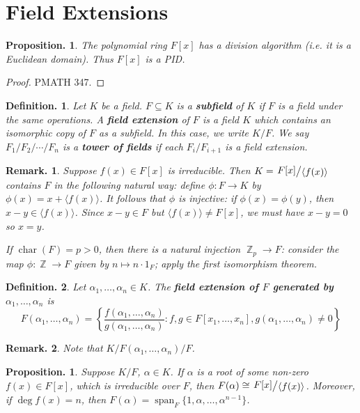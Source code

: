 \documentclass[11pt, a4paper]{memoir}
\DeclareMathOperator{\Z}{{\mathbb{Z}}}
\newcommand{\mbf}[1]{{\boldmath\bfseries #1}}
\theoremstyle{change}
\newtheorem{proposition}[theorem]{Proposition.}
\theoremstyle{plain}
\theoremstyle{nonumberplain}
\newtheorem{definition}{Definition.}
\newtheorem{remark}{Remark.}
\newtheorem{proof}{Proof}
\DeclareMathOperator{\spn}{span}
\newcommand{\quot}[2]{\mathchoice{\left.\raisebox{0.14em}{$#1$}\middle/\raisebox{-0.14em}{$#2$}\right.}
                                 {\left.\raisebox{0.08em}{$#1$}\middle/\raisebox{-0.08em}{$#2$}\right.}
                                 {\left.\raisebox{0.03em}{$#1$}\middle/\raisebox{-0.03em}{$#2$}\right.}
                                 {\left.\raisebox{0em}{$#1$}\middle/\raisebox{0em}{$#2$}\right.}}
\numberwithin{equation}{section}
\begin{document}
\section{Field Extensions}
\begin{proposition}
    The polynomial ring $F[x]$ has a division algorithm (i.e. it is a Euclidean domain).
    Thus $F[x]$ is a PID.
\end{proposition}
\begin{proof}
    PMATH 347.
\end{proof}
\begin{definition}
    Let $K$ be a field.
    $F\subseteq K$ is a \mbf{subfield} of $K$ if $F$ is a field under the same operations.
    A \mbf{field extension} of $F$ is a field $K$ which contains an isomorphic copy of $F$ as a subfield.
    In this case, we write $K/F$.
    We say  $F_1/F_2/\cdots/F_n$ is a \mbf{tower of fields} if each $F_i/F_{i+1}$ is a field extension.
\end{definition}
\begin{remark}
    Suppose $f(x)\in F[x]$ is irreducible.
    Then $K=\quot{F[x]}{\langle f(x)\rangle}$ contains $F$ in the following natural way: define $\phi:F\to K$ by $\phi(x)=x+\langle f(x)\rangle$.
    It follows that $\phi$ is injective: if $\phi(x)=\phi(y)$, then $x-y\in\langle f(x)\rangle$.
    Since $x-y\in F$ but $\langle f(x)\rangle\neq F[x]$, we must have $x-y=0$ so $x=y$.

    If $\operatorname{char}(F)=p>0$, then there is a natural injection $\Z_p\to F$: consider the map $\phi:\Z\to F$ given by $n\mapsto n\cdot 1_F$; apply the first isomorphism theorem.
\end{remark}
\begin{definition}
    Let $\alpha_1,\ldots,\alpha_n\in K$.
    The \mbf{field extension of $F$ generated by $\alpha_1,\ldots,\alpha_n$} is
    \begin{equation*}
        F(\alpha_1,\ldots,\alpha_n)=\left\{\frac{f(\alpha_1,\ldots,\alpha_n)}{g(\alpha_1,\ldots,\alpha_n)}:f,g\in F[x_1,\ldots,x_n], g(\alpha_1,\ldots,\alpha_n)\neq 0\right\}
    \end{equation*}
\end{definition}
\begin{remark}
    Note that $K/F(\alpha_1,\ldots,\alpha_n)/F$.
\end{remark}
\begin{proposition}\label{prop:f-ext}
    Suppose $K/F$, $\alpha\in K$.
    If $\alpha$ is a root of some non-zero $f(x)\in F[x]$, which is irreducible over $F$, then $F(\alpha)\cong \quot{F[x]}{\langle f(x)\rangle}$.
    Moreover, if $\deg f(x)=n$, then $F(\alpha)=\spn_F\{1,\alpha,\ldots,\alpha^{n-1}\}$.
\end{proposition}
\end{document}
